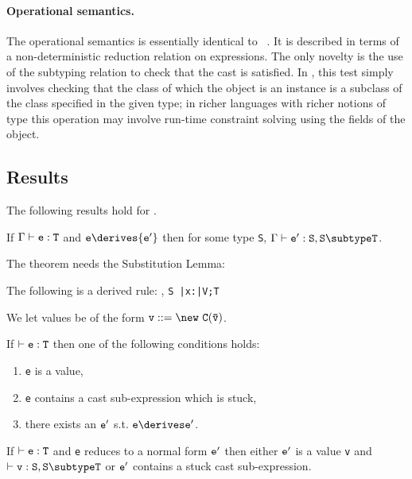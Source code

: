 \paragraph{Operational semantics.}

The operational semantics is essentially identical
to \FJ~\cite{FJ}. It is described in terms of a non-deterministic
reduction relation on expressions. The only novelty is the use of the
subtyping relation to check that the cast is satisfied. In \FXZ, this
test simply involves checking that the class of which the object is an
instance is a subclass of the class specified in the given type; in
richer languages with richer notions of type this operation may
involve run-time constraint solving using the fields of the object.


\subsection{Results}
The following results hold for \FXD.

\begin{theorem} If $\Gamma \vdash {\tt e:T}$
and ${\tt e} \derives {\tt e'}$ then for some type {\tt S}, $\Gamma \vdash {\tt e':S},{\tt S \subtype T}$.
\end{theorem}

The theorem needs the Substitution Lemma:
\begin{lemma} The following is a derived rule:
{\Gamma {}, {\tt S \subtype \bar{\tt x}:\bar{\tt V};T}}
\end{lemma}

We let values be of the form $\tt v ::= \new\ C(\bar{\tt v})$. 
\begin{theorem}[Progress]
If $\vdash {\tt e:T}$ then one of the following conditions holds:
\begin{enumerate}
\item {\tt e} is a value,
\item {\tt e} contains a cast sub-expression which is stuck,
\item there exists an $\tt e'$ s.t. $\tt e\derives e'$.
\end{enumerate}
\end{theorem}

\begin{theorem}
If $\vdash {\tt e:T}$ and {\tt e} reduces to a normal form ${\tt e'}$ then
either $\tt e'$ is a value {\tt v} and $\vdash {\tt v:S},{\tt S\subtype T}$ or
${\tt e'}$ contains  a stuck cast sub-expression.
\end{theorem}




